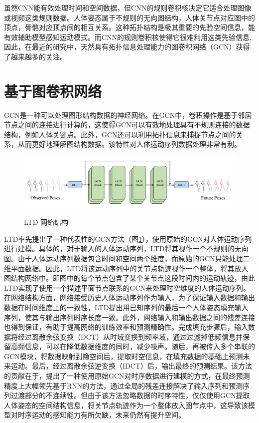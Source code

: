 虽然CNN能有效处理时间和空间数据，但CNN的规则卷积核决定它适合处理图像或视频这类规则数据。人体姿态属于不规则的无向图结构，人体关节点对应图中的顶点，骨骼对应顶点间的相互关系。这种拓扑结构是极其重要的先验空间信息，能有效辅助模型感知运动模式。而CNN的规则卷积核使得它很难利用这类先验信息,因此，在最近的研究中，天然具有拓扑信息处理能力的图卷积网络（GCN）获得了越来越多的关注。


\section{基于图卷积网络}
GCN是一种可以处理图形结构数据的神经网络。在GCN中，卷积操作是基于邻居节点之间的连接进行计算的，这使得GCN可以有效地处理具有不规则连接的数据结构，例如人体关键点。此外，GCN还可以利用拓扑信息来捕捉节点之间的关系，从而更好地理解图结构数据。该特性对人体运动序列数据处理非常有利。

\begin{figure}[ht]
    \centering
    \includegraphics[width=1\textwidth]{FigMa/LTD.png}\\
    \vspace{-0.3cm}
    \caption{LTD 网络结构}
    \label{fig:LTD}
\end{figure}
LTD\parencite{mao2019learning}率先提出了一种代表性的GCN方法（图\ref{fig:LTD}），使用原始的GCN对人体运动序列进行建模。具体的，对于输入的人体运动序列，LTD将其视作一个不规则的无向图。由于人体运动序列数据包含时间和空间两个维度，而原始的GCN只能处理二维平面数据。因此，LTD将该运动序列中的关节点轨迹视作一个整体，将其放入图结构网络中。即图中的每个节点包含了某个关节点这段时间内的运动轨迹，由此LTD实现了使用一个描述平面节点联系的GCN来处理时空维度的人体运动序列。在网络结构方面，网络接受历史人体运动序列作为输入，为了保证输入数据和输出数据在时间维度上的一致性，LTD提出用已知序列的最后一个人体姿态填充输入序列，使其与输出序列时序长度一致。此外，网络输入和输出数据之间的残差连接也得到保证，有助于提高网络的训练效率和预测精确性。完成填充步骤后，输入数据将经过离散余弦变换（DCT）从时域变换到频率域，通过过滤掉低频信息并保留高频信息，可以在降低数据维度的同时，减少噪声。随后，再被传入多个串联的GCN模块，将数据映射到隐空间后，提取时空信息，在填充数据的基础上预测未来运动。最后，经过离散余弦逆变换（IDCT）后，输出最终的预测结果。该方法的贡献在于，提出了一种使用原始GCN对时序数据进行建模的方式，在最终预测精度上大幅领先基于RNN的方法，通过全局的残差连接解决了输入序列和预测序列过渡部分的不连续性。但由于该方法忽略数据的时序特性，仅仅使用GCN提取人体姿态的空间结构信息，将关节点轨迹作为一个整体放入图节点中，这导致该模型对时序运动的感知能力有所欠缺，未来仍然有提升空间。

